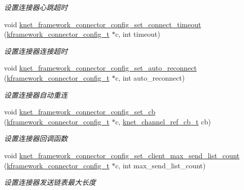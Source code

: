 \begin{DoxyCompactItemize}
\begin{DoxyCompactList}\small\item\em 设置连接器心跳超时 \end{DoxyCompactList}\item 
void \hyperlink{a00104_gacf0d08bb6f135c12326d30acad7456f1_gacf0d08bb6f135c12326d30acad7456f1}{knet\+\_\+framework\+\_\+connector\+\_\+config\+\_\+set\+\_\+connect\+\_\+timeout} (\hyperlink{a00051_a44d3033eba5a4fd784a741700a7a2521_a44d3033eba5a4fd784a741700a7a2521}{kframework\+\_\+connector\+\_\+config\+\_\+t} $\ast$c, int timeout)
\begin{DoxyCompactList}\small\item\em 设置连接器连接超时 \end{DoxyCompactList}\item 
void \hyperlink{a00104_ga984a212938eb7d5b79fae88c5eeb1644_ga984a212938eb7d5b79fae88c5eeb1644}{knet\+\_\+framework\+\_\+connector\+\_\+config\+\_\+set\+\_\+auto\+\_\+reconnect} (\hyperlink{a00051_a44d3033eba5a4fd784a741700a7a2521_a44d3033eba5a4fd784a741700a7a2521}{kframework\+\_\+connector\+\_\+config\+\_\+t} $\ast$c, int auto\+\_\+reconnect)
\begin{DoxyCompactList}\small\item\em 设置连接器自动重连 \end{DoxyCompactList}\item 
void \hyperlink{a00104_ga03024112cca453db282a4aa4af7bedc8_ga03024112cca453db282a4aa4af7bedc8}{knet\+\_\+framework\+\_\+connector\+\_\+config\+\_\+set\+\_\+cb} (\hyperlink{a00051_a44d3033eba5a4fd784a741700a7a2521_a44d3033eba5a4fd784a741700a7a2521}{kframework\+\_\+connector\+\_\+config\+\_\+t} $\ast$c, \hyperlink{a00051_a8a7d96123ef4565c6d08fe58a10476a9_a8a7d96123ef4565c6d08fe58a10476a9}{knet\+\_\+channel\+\_\+ref\+\_\+cb\+\_\+t} cb)
\begin{DoxyCompactList}\small\item\em 设置连接器回调函数 \end{DoxyCompactList}\item 
void \hyperlink{a00104_ga32b058fe0a17d4a609097157761bb9f1_ga32b058fe0a17d4a609097157761bb9f1}{knet\+\_\+framework\+\_\+connector\+\_\+config\+\_\+set\+\_\+client\+\_\+max\+\_\+send\+\_\+list\+\_\+count} (\hyperlink{a00051_a44d3033eba5a4fd784a741700a7a2521_a44d3033eba5a4fd784a741700a7a2521}{kframework\+\_\+connector\+\_\+config\+\_\+t} $\ast$c, int max\+\_\+send\+\_\+list\+\_\+count)
\begin{DoxyCompactList}\small\item\em 设置连接器发送链表最大长度 \end{DoxyCompactList}\item 

\end{DoxyCompactItemize}
